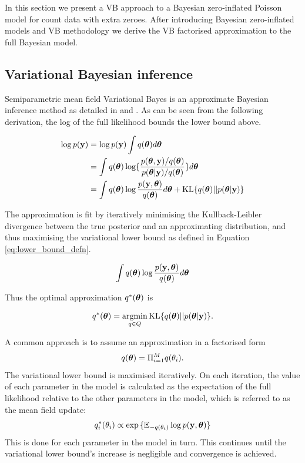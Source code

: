 \documentclass{article}[12pt]
\begin{document}
In this section we present a VB approach to a Bayesian zero-inflated Poisson model
for count data with extra zeroes. After introducing Bayesian zero-inflated models
and VB methodology we derive the VB factorised approximation to the full Bayesian
model. 

\subsection{Variational Bayesian inference}

Semiparametric mean field Variational Bayes is an approximate Bayesian inference method as detailed in
\cite{ormerod10} and \cite{RohdeWand2015}. As can be seen from the following derivation, the log of the full likelihood 
bounds the lower bound above.

\begin{align*}
\log p(\vy) &= \log p(\vy) \int q(\vtheta) d \vtheta \\
&= \int q(\vtheta) \log \{ \frac{p(\vtheta, \vy) / q(\vtheta)}{p(\vtheta | \vy) / q(\vtheta)} \} d \vtheta \\
&= \int q(\vtheta) \log \frac{p(\vy, \vtheta)}{q(\vtheta)} d \vtheta +
	 \text{KL} \{ {q(\vtheta) || p(\vtheta|\vy)} \} %
\end{align*}

The approximation is fit by iteratively minimising the Kullback-Leibler divergence between the true 
posterior and an approximating distribution, and thus maximising the variational lower bound as defined in 
Equation \ref{eq:lower_bound_defn}.

\begin{equation}
\label{eq:lower_bound_defn}
\int q({\boldsymbol \theta}) \log \frac{p({\bf y}, {\boldsymbol \theta})}{q({\boldsymbol \theta})} d {\boldsymbol \theta}
\end{equation}

Thus the optimal approximation $q^*({\boldsymbol \theta})$ is

$$
q^*(\vtheta) = \argmin_{q \in Q} \text{KL} \{ {q(\vtheta) || p(\vtheta|\vy)} \}.
$$

A common approach is to assume an approximation in a factorised form
$$q({\boldsymbol \theta}) = \Pi_{i=1}^M q(\theta_i).$$
The variational lower bound is maximised iteratively. On each iteration, the value of each parameter in the
model is calculated as the expectation of the full likelihood relative to the other parameters in the model, 
which is referred to as the mean field update:
$$q_i^*(\theta_i) \propto \exp{\{ {\mathbb E}_{-q(\theta_i)} \log p({\bf y}, {\boldsymbol\theta}) \}}$$
This is done for each parameter in the model in turn.
This continues until the variational lower bound's increase is negligible and convergence is achieved.
\end{document}
